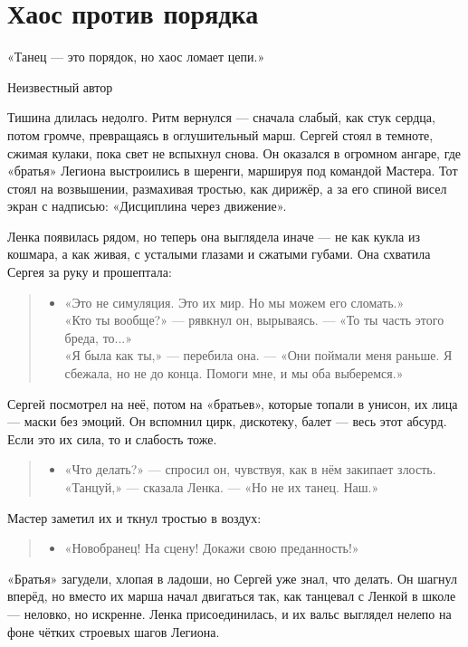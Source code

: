 \documentclass[12pt,a4paper]{book}
\newenvironment{dialogue}{\begin{quote}\itshape\begin{itemize}\item[]}{\end{itemize}\end{quote}}
\begin{document}
\chapter{Хаос против порядка}
\epigraph{«Танец — это порядок, но хаос ломает цепи.»}{Неизвестный автор}

Тишина длилась недолго. Ритм вернулся --- сначала слабый, как стук сердца, потом громче, превращаясь в оглушительный марш. Сергей стоял в темноте, сжимая кулаки, пока свет не вспыхнул снова. Он оказался в огромном ангаре, где «братья» Легиона выстроились в шеренги, маршируя под командой Мастера. Тот стоял на возвышении, размахивая тростью, как дирижёр, а за его спиной висел экран с надписью: «Дисциплина через движение».

Ленка появилась рядом, но теперь она выглядела иначе --- не как кукла из кошмара, а как живая, с усталыми глазами и сжатыми губами. Она схватила Сергея за руку и прошептала:

\begin{dialogue}
«Это не симуляция. Это их мир. Но мы можем его сломать.» \\
«Кто ты вообще?» --- рявкнул он, вырываясь. --- «То ты часть этого бреда, то...» \\
«Я была как ты,» --- перебила она. --- «Они поймали меня раньше. Я сбежала, но не до конца. Помоги мне, и мы оба выберемся.»
\end{dialogue}

Сергей посмотрел на неё, потом на «братьев», которые топали в унисон, их лица --- маски без эмоций. Он вспомнил цирк, дискотеку, балет --- весь этот абсурд. Если это их сила, то и слабость тоже.

\begin{dialogue}
«Что делать?» --- спросил он, чувствуя, как в нём закипает злость. \\
«Танцуй,» --- сказала Ленка. --- «Но не их танец. Наш.»
\end{dialogue}

Мастер заметил их и ткнул тростью в воздух:

\begin{dialogue}
«Новобранец! На сцену! Докажи свою преданность!»
\end{dialogue}

«Братья» загудели, хлопая в ладоши, но Сергей уже знал, что делать. Он шагнул вперёд, но вместо их марша начал двигаться так, как танцевал с Ленкой в школе --- неловко, но искренне. Ленка присоединилась, и их вальс выглядел нелепо на фоне чётких строевых шагов Легиона.
\end{document}
